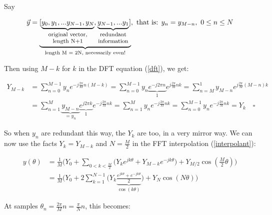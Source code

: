 \documentclass[10pt]{article}
\begin{document}
Say\vspace{-8mm}

$$\vec{y} = \underbrace{[\underbrace{y_0, y_1, ... y_{N-1}, y_N}_{\parbox{20mm}{\footnotesize \centering original vector, length N+1}}, \underbrace{y_{N-1}, ... y_1}_{\parbox{16mm}{\footnotesize \centering redundant information}}]}_{\text{length M = 2N, necessarily even!}}, \text{ that is: } y_n = y_{M-n},\ 0 \leq n \leq N$$

Then using $M-k$ for $k$ in the DFT equation (\autoref{dft}), we get:

\begin{align*}
Y_{M-k} &= \sum_{n=0}^{M-1} y_n e^{-j \frac{2\pi}{M}n(M-k)} = \sum_{n=0}^{M-1} y_n \underbrace{e^{-j 2\pi n}}_{1} e^{j \frac{2\pi}{M}nk} = \sum_{n = M}^{1} y_{M-n} e^{j \frac{2\pi}{M}(M - n)k} \\
&= \sum_{n=1}^{M} \underbrace{y_{M-n}}_{= y_n} \underbrace{e^{j 2\pi k}}_{1} e^{-j\frac{2\pi}{M}nk} = \sum_{n=1}^M y_n e^{-j \frac{2\pi}{M}nk} = \sum_{n=0}^{M-1} y_n e^{-j \frac{2\pi}{M}nk} = Y_k \quad \square
\end{align*}
\newline

So when $y_n$ are redundant this way, the $Y_k$ are too, in a very mirror way. We can now use the facts $Y_k = Y_{M-k}$ and $N = \frac{M}{2}$ in the FFT interpolation (\autoref{interpolant}):

\begin{equation}\label{reconstruction}
\begin{aligned}
y(\theta) &= \frac{1}{M} \Big(Y_0 + \sum_{0 < k < \frac{M}{2}} \big( Y_k e^{j k \theta} + Y_{M-k} e^{-j k \theta}\big) + Y_{M/2}\cos(\frac{M}{2}\theta) \Big) \\
&= \frac{1}{M} \Big(Y_0 + 2 \sum_{k = 1}^{N-1} \big( Y_k \underbrace{\frac{e^{j k \theta} + e^{-j k \theta}}{2}}_{\cos(k\theta)} \big) + Y_N\cos(N \theta) \Big)
\end{aligned}
\end{equation}

At samples $\theta_n = \frac{2\pi}{M}n = \frac{\pi}{N}n$, this becomes:\vspace{-2mm}
\end{document}
